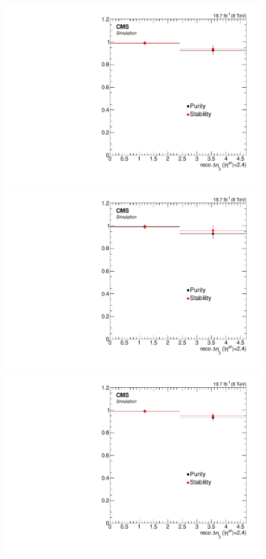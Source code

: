 \begin{figure}[hbtp]
\begin{center}
    \includegraphics[width=0.8\cmsFigWidth]{Figures/Unfolding/BinMigration/PurityStability_4m_CentralDeta_Mad}
    \includegraphics[width=0.8\cmsFigWidth]{Figures/Unfolding/BinMigration/PurityStability_4e_CentralDeta_Mad}
    \includegraphics[width=0.8\cmsFigWidth]{Figures/Unfolding/BinMigration/PurityStability_2e2m_CentralDeta_Mad}

\end{center}
\end{figure}
